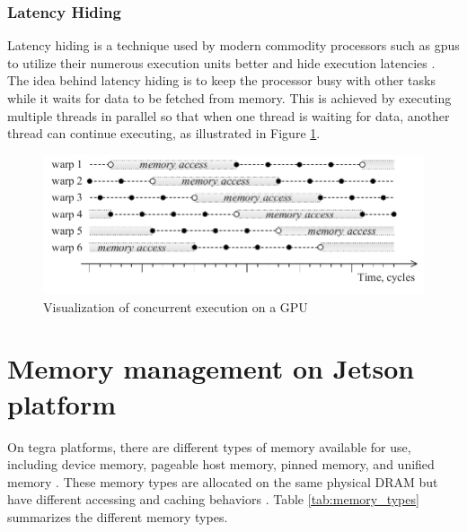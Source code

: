\subsubsection{Latency Hiding}
Latency hiding is a technique used by modern commodity processors such as \glspl{gpu} to utilize their numerous execution units better and hide execution latencies \cite[35]{volkovLatencyHiding2016}.
The idea behind latency hiding is to keep the processor busy with other tasks while it waits for data to be fetched from memory.
This is achieved by executing multiple threads in parallel so that when one thread is waiting for data, another thread can continue executing, as illustrated in Figure \ref{fig:concurrency}.

\begin{figure}[H]
    \centering
    \includegraphics[width=.7\textwidth]{figures/PDF/concurrency_p54.pdf}
    \caption{Visualization of concurrent execution on a GPU \cite[54]{volkovLatencyHiding2016}}
    \label{fig:concurrency}
\end{figure}



\section{Memory management on Jetson platform}
\label{sec:jx_memory}
On \gls{tegra} platforms, there are different types of memory available for use, including device memory, pageable host memory, pinned memory, and unified memory \cite[13]{nvidiaCUDAFTegra2023}.
These memory types are allocated on the same physical DRAM but have different accessing and caching behaviors \cite[5]{nvidiaCUDAFTegra2023}.
Table \ref{tab:memory_types} summarizes the different memory types.


\providecommand{\tmpfootnote}{\footnote{Cached where compute capability is greater than or equal to 7.2 \cite{nvidiaCUDAFTegra2023}. The \jx has compute capability of 7.2 \cite{CUDA2023}}}

